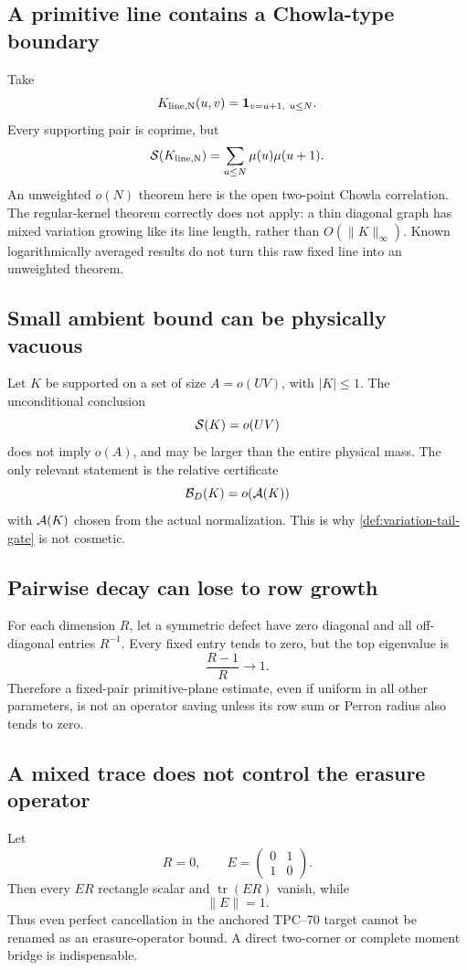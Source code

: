 \subsection{A primitive line contains a Chowla-type boundary}

Take
\[
 K_{\rm line,N}(u,v)=\one_{v=u+1,\ u\le N}.
\]
Every supporting pair is coprime, but
\[
 \mathcal S(K_{\rm line,N})
 =
 \sum_{u\le N}\mu(u)\mu(u+1).
\]
An unweighted \(o(N)\) theorem here is the open two-point Chowla
correlation.  The regular-kernel theorem correctly does not apply: a thin
diagonal graph has mixed variation growing like its line length, rather
than \(O(\|K\|_\infty)\).  Known logarithmically averaged results
\citep{Tao2016LogChowla} do not turn this raw fixed line into an
unweighted theorem.

\subsection{Small ambient bound can be physically vacuous}

Let \(K\) be supported on a set of size \(A=o(UV)\), with
\(|K|\le1\).  The unconditional conclusion
\[
 \mathcal S(K)=o(UV)
\]
does not imply \(o(A)\), and may be larger than the entire physical mass.
The only relevant statement is the relative certificate
\[
 \mathcal B_D(K)=o(\mathcal A(K))
\]
with \(\mathcal A(K)\) chosen from the actual normalization.  This is why
\cref{def:variation-tail-gate} is not cosmetic.

\subsection{Pairwise decay can lose to row growth}

For each dimension \(R\), let a symmetric defect have zero diagonal and
all off-diagonal entries \(R^{-1}\).  Every fixed entry tends to zero, but
the top eigenvalue is
\[
 \frac{R-1}{R}\longrightarrow1.
\]
Therefore a fixed-pair primitive-plane estimate, even if uniform in all
other parameters, is not an operator saving unless its row sum or Perron
radius also tends to zero.

\subsection{A mixed trace does not control the erasure operator}

Let
\[
 R=0,
 \qquad
 E=
 \begin{pmatrix}
 0&1\\
 1&0
 \end{pmatrix}.
\]
Then every \(ER\) rectangle scalar and
\(\operatorname{tr}(ER)\) vanish, while
\[
 \|E\|=1.
\]
Thus even perfect cancellation in the anchored TPC--70 target cannot be
renamed as an erasure-operator bound.  A direct two-corner or complete
moment bridge is indispensable.


